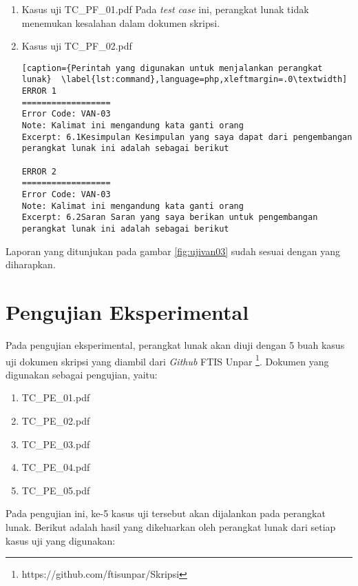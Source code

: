 \begin{enumerate}
	\item Kasus uji TC\_PF\_01.pdf
	Pada \textit{test case} ini, perangkat lunak tidak menemukan kesalahan dalam dokumen skripsi.
	
	\item Kasus uji TC\_PF\_02.pdf
	
\begin{lstlisting}[caption={Perintah yang digunakan untuk menjalankan perangkat lunak}	\label{lst:command},language=php,xleftmargin=.0\textwidth]
ERROR 1
==================
Error Code: VAN-03
Note: Kalimat ini mengandung kata ganti orang
Excerpt: 6.1Kesimpulan Kesimpulan yang saya dapat dari pengembangan perangkat lunak ini adalah sebagai berikut

ERROR 2
==================
Error Code: VAN-03
Note: Kalimat ini mengandung kata ganti orang
Excerpt: 6.2Saran Saran yang saya berikan untuk pengembangan perangkat lunak ini adalah sebagai berikut
\end{lstlisting}
\end{enumerate}

Laporan yang ditunjukan pada gambar \ref{fig:ujivan03} sudah sesuai dengan yang diharapkan.

\section{Pengujian Eksperimental}
Pada pengujian eksperimental, perangkat lunak akan diuji dengan 5 buah kasus uji dokumen skripsi yang diambil dari \textit{Github} FTIS Unpar \footnote{https://github.com/ftisunpar/Skripsi}. Dokumen yang digunakan sebagai pengujian, yaitu:

\begin{enumerate}
	\item TC\_PE\_01.pdf~\cite{pe01}
	\item TC\_PE\_02.pdf~\cite{pe02}
	\item TC\_PE\_03.pdf~\cite{pe03}
	\item TC\_PE\_04.pdf~\cite{pe04}
	\item TC\_PE\_05.pdf~\cite{pe05} 
\end{enumerate}

Pada pengujian ini, ke-5 kasus uji tersebut akan dijalankan pada perangkat lunak. Berikut adalah hasil yang dikeluarkan oleh perangkat lunak dari setiap kasus uji yang digunakan:

